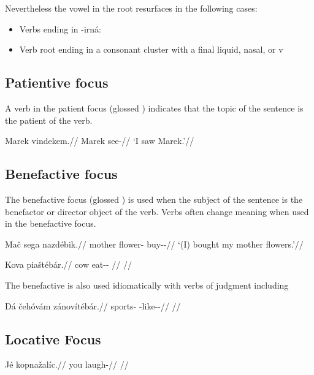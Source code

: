 Nevertheless the vowel  in the root resurfaces in the following cases:

\begin{itemize}
	\item Verbs ending in -irná:
	\item Verb root ending in a consonant cluster with a final liquid, nasal, or v
\end{itemize}

\subsection{Patientive focus}
\par A verb in the patient focus (glossed ) indicates that the topic of the sentence is the patient of the verb.

\pex
\begingl
\gla Marek vindekem.//
\glb Marek see-//
\glft `I saw Marek.'//
\endgl
\xe


\subsection{Benefactive focus}
\par The benefactive focus (glossed ) is used when the subject of the sentence is the benefactor or director object of the verb. Verbs often change meaning when used in the benefactive focus.


\begin{multicols}{2}
\pex
\begingl
\gla Mač sega nazdébik.//
\glb mother flower-\Pat{} buy-\Ben{}-\Pf{}//
\glft `(I) bought my mother flowers.'//
\endgl
\xe

\pex
\begingl
\gla Kova piaštéb\'ar.//
\glb cow eat-\Ben{}-\Prog{} //
\glft {}//
\endgl
\xe

\end{multicols}

The benefactive is also used idiomatically with verbs of judgment including  

\pex
\begingl
\gla Dá čehóvám zánovítébár.//
\glb \First\Sg{} sports-\Agt{} \Neg{}-like-\Ben{}-\Prog{}//
\glft {}//
\endgl
\xe

\subsection{Locative Focus}

\pex
\begingl
\gla Jé kopnažalíc.//
\glb you laugh-//
\glft {}//
\endgl
\xe

